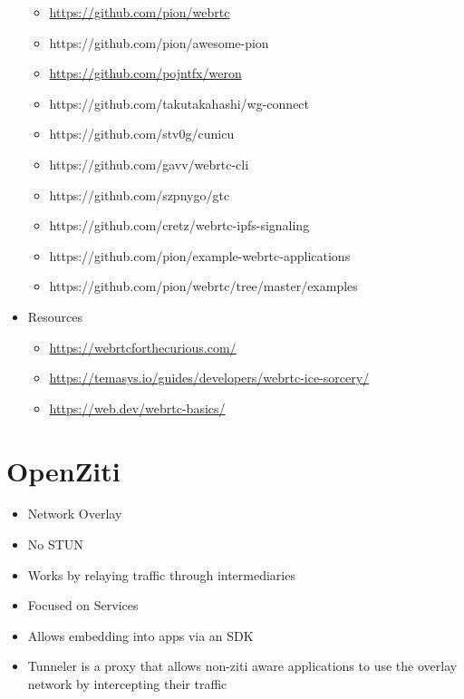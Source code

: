 \begin{itemize}
  \begin{itemize}
  \tightlist
  \item
    \url{https://github.com/pion/webrtc}
  \item
    https://github.com/pion/awesome-pion
  \item
    \url{https://github.com/pojntfx/weron}
  \item
    https://github.com/takutakahashi/wg-connect
  \item
    https://github.com/stv0g/cunicu
  \item
    https://github.com/gavv/webrtc-cli
  \item
    https://github.com/szpnygo/gtc
  \item
    https://github.com/cretz/webrtc-ipfs-signaling
  \item
    https://github.com/pion/example-webrtc-applications
  \item
    https://github.com/pion/webrtc/tree/master/examples
  \end{itemize}
\item
  Resources

  \begin{itemize}
  \tightlist
  \item
    \url{https://webrtcforthecurious.com/}
  \item
    \url{https://temasys.io/guides/developers/webrtc-ice-sorcery/}
  \item
    \href{https://web.dev/webrtc-basics/\#toc-rtcpeerconnection}{https://web.dev/webrtc-basics/}
  \end{itemize}
\end{itemize}

\hypertarget{openziti}{%
\section{OpenZiti}\label{openziti}}

\begin{itemize}
\tightlist
\item
  Network Overlay
\item
  No STUN
\item
  Works by relaying traffic through intermediaries
\item
  Focused on Services
\item
  Allows embedding into apps via an SDK
\item
  Tunneler is a proxy that allows non-ziti aware applications to use the
  overlay network by intercepting their traffic
\end{itemize}

